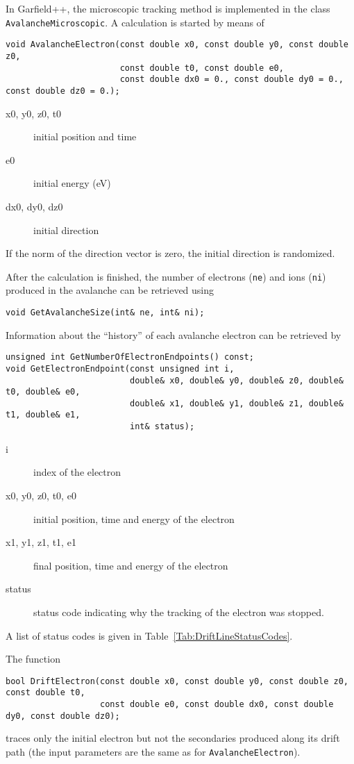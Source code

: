 In Garfield++, the microscopic tracking method is implemented in the class 
\texttt{AvalancheMicroscopic}. A calculation is started by means of
\begin{lstlisting}
void AvalancheElectron(const double x0, const double y0, const double z0,
                       const double t0, const double e0,
                       const double dx0 = 0., const double dy0 = 0., const double dz0 = 0.);
\end{lstlisting}
\begin{description}
  \item[x0, y0, z0, t0] initial position and time
  \item[e0] initial energy (eV)
  \item[dx0, dy0, dz0] initial direction 
\end{description}
If the norm of the direction vector is zero, 
the initial direction is randomized.

After the calculation is finished, the number of electrons 
(\texttt{ne}) and ions (\texttt{ni})  
produced in the avalanche can be retrieved using
\begin{lstlisting}
void GetAvalancheSize(int& ne, int& ni);
\end{lstlisting}
Information about the ``history'' of each avalanche electron can be 
retrieved by
\begin{lstlisting}
unsigned int GetNumberOfElectronEndpoints() const;
void GetElectronEndpoint(const unsigned int i, 
                         double& x0, double& y0, double& z0, double& t0, double& e0,
                         double& x1, double& y1, double& z1, double& t1, double& e1,
                         int& status); 
\end{lstlisting}
\begin{description}
  \item[i] index of the electron
  \item[x0, y0, z0, t0, e0] initial position, time and energy of the electron
  \item[x1, y1, z1, t1, e1] final position, time and energy of the electron
  \item[status] status code indicating why the tracking of the electron was stopped.  
\end{description}
A list of status codes is given in Table~\ref{Tab:DriftLineStatusCodes}.

The function
\begin{lstlisting}
bool DriftElectron(const double x0, const double y0, const double z0, const double t0,
                   const double e0, const double dx0, const double dy0, const double dz0);
\end{lstlisting}
traces only the initial electron but not the secondaries 
produced along its drift path 
(the input parameters are the same as for \texttt{AvalancheElectron}).

